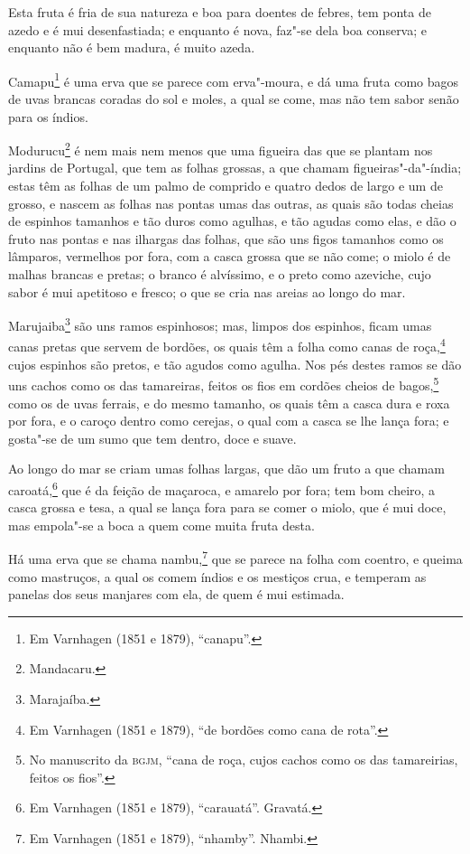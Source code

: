 Esta fruta é fria de sua natureza e boa para doentes de febres, tem ponta de azedo e é mui
desenfastiada; e enquanto é nova, faz"-se dela boa conserva; e enquanto não é bem madura, é
muito azeda.

Camapu\footnote{ Em Varnhagen (1851 e 1879), ``canapu''.} é uma erva que se parece com
erva"-moura, e dá uma fruta como bagos de uvas brancas coradas do sol e moles, a qual se
come, mas não tem sabor senão para os índios.

Modurucu\footnote{ Mandacaru.} é nem mais nem menos que uma figueira das que se plantam
nos jardins de Portugal, que tem as folhas grossas, a que chamam figueiras"-da"-índia; estas
têm as folhas de um palmo de comprido e quatro dedos de largo e um de grosso, e nascem as
folhas nas pontas umas das outras, as quais são todas cheias de espinhos tamanhos e tão
duros como agulhas, e tão agudas como elas, e dão o fruto nas pontas e nas ilhargas das
folhas, que são uns figos tamanhos como os lâmparos, vermelhos por fora, com a casca
grossa que se não come; o miolo é de malhas brancas e pretas; o branco é alvíssimo, e o
preto como azeviche, cujo sabor é mui apetitoso e fresco; o que se cria nas areias ao
longo do mar.

Marujaiba\footnote{ Marajaíba.} são uns ramos espinhosos; mas, limpos dos espinhos, ficam
umas canas pretas que servem de bordões, os quais têm a folha como canas de
roça,\footnote{ Em Varnhagen (1851 e 1879), ``de bordões como cana de rota''.} cujos
espinhos são pretos, e tão agudos como agulha. Nos pés destes ramos se dão uns cachos como
os das tamareiras, feitos os fios em cordões cheios de bagos,\footnote{ No manuscrito da
\textsc{bgjm}, ``cana de roça, cujos cachos como os das tamareirias, feitos os fios''.}
como os de uvas ferrais, e do mesmo tamanho, 
os quais têm a casca dura e roxa por fora, e o caroço dentro como cerejas, o
qual com a casca se lhe lança fora; e gosta"-se de um sumo que tem dentro, doce e suave.

Ao longo do mar se criam umas folhas largas, que dão um fruto a que chamam
caroatá,\footnote{ Em Varnhagen (1851 e 1879), ``carauatá''. Gravatá.} que é da feição de
maçaroca, e amarelo por fora; tem bom cheiro, a casca grossa e tesa, a qual se lança fora
para se comer o miolo, que é mui doce, mas empola"-se a boca a quem come muita fruta desta.

Há uma erva que se chama nambu,\footnote{ Em Varnhagen (1851 e 1879), ``nhamby''. Nhambi.}
que se parece na folha com coentro, e queima como mastruços, a qual os comem índios e os
mestiços crua, e temperam as panelas dos seus manjares com ela, de quem é mui estimada.

